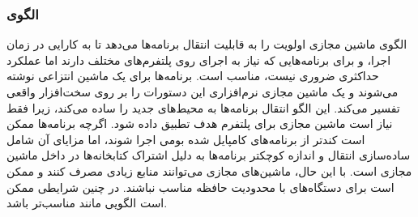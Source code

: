 \subsubsection{الگوی }
\label{archVirtMachineSec}
\begin{RTL}
الگوی ماشین مجازی \cite{ref4} اولویت را
به قابلیت انتقال برنامه‌ها می‌دهد تا به کارایی
در زمان اجرا، و برای برنامه‌هایی که نیاز به اجرای روی پلتفرم‌های مختلف
دارند اما عملکرد حداکثری ضروری نیست، مناسب است.
برنامه‌ها برای یک ماشین انتزاعی نوشته می‌شوند و یک ماشین مجازی
نرم‌افزاری این دستورات را بر روی سخت‌افزار واقعی تفسیر می‌کند.
این الگو انتقال برنامه‌ها به محیط‌های جدید را ساده می‌کند،
زیرا فقط نیاز است ماشین مجازی برای پلتفرم هدف تطبیق داده شود.
اگرچه برنامه‌ها ممکن است کندتر از برنامه‌های کامپایل شده بومی اجرا
شوند، اما مزایای آن شامل ساده‌سازی انتقال و اندازه کوچکتر برنامه‌ها به
دلیل اشتراک کتابخانه‌ها در داخل ماشین مجازی است. با این حال، ماشین‌های
مجازی می‌توانند منابع زیادی مصرف کنند و ممکن است برای دستگاه‌های با
محدودیت حافظه مناسب نباشند. در چنین شرایطی ممکن است الگویی مانند
مناسب‌تر باشد.
\end{RTL}